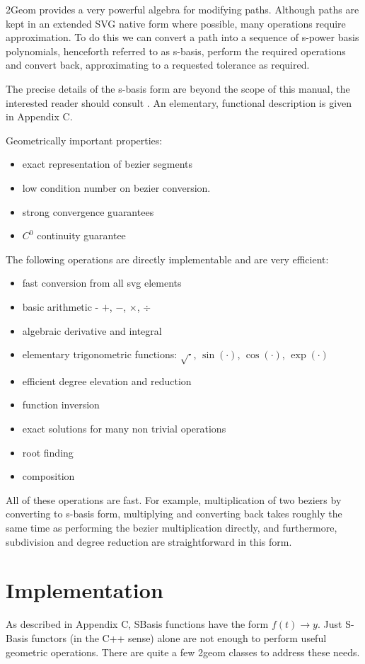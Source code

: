 \documentclass{book}
\begin{document}
2Geom provides a very powerful algebra for modifying paths.  Although
paths are kept in an extended SVG native form where possible, many
operations require approximation.  To do this we can convert a path
into a sequence of s-power basis polynomials, henceforth referred to
as s-basis, perform the required operations and convert back,
approximating to a requested tolerance as required.

The precise details of the s-basis form are beyond the scope of this
manual, the interested reader should consult \cite{SanchezReyes1997,SanchezReyes2000,SanchezReyes2001,SanchezReyes2003,SanchezReyes2004}.
An elementary, functional description is given in Appendix C.

Geometrically important properties:
\begin{itemize}
\item exact representation of bezier segments
\item low condition number on bezier conversion.
\item strong convergence guarantees
\item $C^0$ continuity guarantee
\end{itemize}

The following operations are directly implementable and are very efficient:
\begin{itemize}
\item fast conversion from all svg elements
\item basic arithmetic - $+$, $-$, $\times$, $\div$
\item algebraic derivative and integral
\item elementary trigonometric functions: $\sqrt{\cdot}$, $\sin(\cdot)$, $\cos(\cdot)$, $\exp(\cdot)$
\item efficient degree elevation and reduction
\item function inversion
\item exact solutions for many non trivial operations
\item root finding
\item composition
\end{itemize}

All of these operations are fast.  For example, multiplication of two
beziers by converting to s-basis form, multiplying and converting back
takes roughly the same time as performing the bezier multiplication
directly, and furthermore, subdivision and degree reduction are
straightforward in this form.

\section{Implementation}
As described in Appendix C, SBasis functions have the form $f(t) \rightarrow y$.
Just S-Basis functors (in the C++ sense) alone are not enough to perform
useful geometric operations.  There are quite a few 2geom classes to
address these needs.
\end{document}
